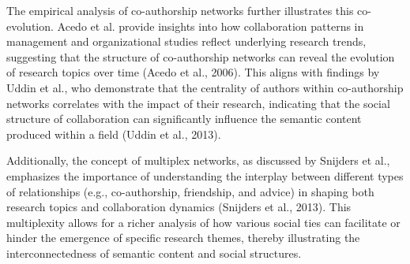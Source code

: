 \documentclass[12pt]{article}
\begin{document}
The empirical analysis of co-authorship networks further illustrates this co-evolution. Acedo et al. provide insights into how collaboration patterns in management and organizational studies reflect underlying research trends, suggesting that the structure of co-authorship networks can reveal the evolution of research topics over time (Acedo et al., 2006). This aligns with findings by Uddin et al., who demonstrate that the centrality of authors within co-authorship networks correlates with the impact of their research, indicating that the social structure of collaboration can significantly influence the semantic content produced within a field (Uddin et al., 2013).

Additionally, the concept of multiplex networks, as discussed by Snijders et al., emphasizes the importance of understanding the interplay between different types of relationships (e.g., co-authorship, friendship, and advice) in shaping both research topics and collaboration dynamics (Snijders et al., 2013). This multiplexity allows for a richer analysis of how various social ties can facilitate or hinder the emergence of specific research themes, thereby illustrating the interconnectedness of semantic content and social structures.
\end{document}
